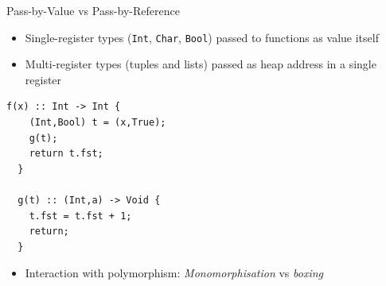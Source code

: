 \documentclass[dvipsnames,aspectratio=169]{beamer}
\begin{document}
\begin{frame}[fragile]{Pass-by-Value vs Pass-by-Reference}

  \begin{itemize}
    \item Single-register types (\texttt{Int}, \texttt{Char}, \texttt{Bool})
          passed to functions as value itself
    \item Multi-register types (tuples and lists) passed as heap address
          in a single register
  \end{itemize}

\begin{lstlisting}[language=spl]
  f(x) :: Int -> Int {
    (Int,Bool) t = (x,True);
    g(t);
    return t.fst;
  }

  g(t) :: (Int,a) -> Void {
    t.fst = t.fst + 1;
    return;
  }
\end{lstlisting}\vspace{-6mm}
%
\begin{itemize}
  \item Interaction with polymorphism: \emph{Monomorphisation} vs \emph{boxing}
\end{itemize}

\end{frame}







\end{document}
